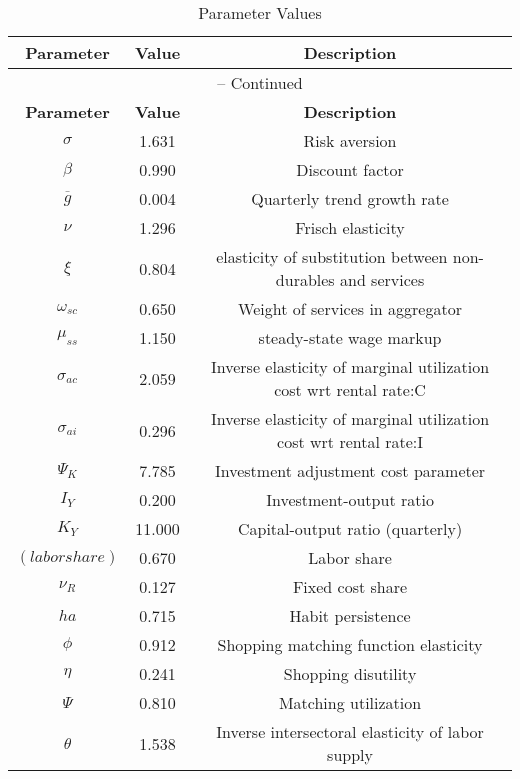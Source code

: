 \begin{center}
\begin{longtable}{ccc}
\caption{Parameter Values}\\%
\toprule%
\multicolumn{1}{c}{\textbf{Parameter}} &
\multicolumn{1}{c}{\textbf{Value}} &
 \multicolumn{1}{c}{\textbf{Description}}\\%
\midrule%
\endfirsthead
\multicolumn{3}{c}{{\tablename} \thetable{} -- Continued}\\%
\midrule%
\multicolumn{1}{c}{\textbf{Parameter}} &
\multicolumn{1}{c}{\textbf{Value}} &
  \multicolumn{1}{c}{\textbf{Description}}\\%
\midrule%
\endhead
${\sigma}$ 	 & 	 1.631 	 & 	 Risk aversion\\
${\beta}$ 	 & 	 0.990 	 & 	 Discount factor\\
${\overline{g}}$ 	 & 	 0.004 	 & 	 Quarterly trend growth rate\\
$\nu$ 	 & 	 1.296 	 & 	 Frisch elasticity\\
$\xi$ 	 & 	 0.804 	 & 	 elasticity of substitution between non-durables and services\\
$\omega_{sc}$ 	 & 	 0.650 	 & 	 Weight of services in aggregator\\
$\mu_{ss}$ 	 & 	 1.150 	 & 	 steady-state wage markup\\
${\sigma_{ac}}$ 	 & 	 2.059 	 & 	 Inverse elasticity of marginal utilization cost wrt rental rate:C\\
${\sigma_{ai}}$ 	 & 	 0.296 	 & 	 Inverse elasticity of marginal utilization cost wrt rental rate:I\\
${\Psi_{K}}$ 	 & 	 7.785 	 & 	 Investment adjustment cost parameter\\
${I_Y}$ 	 & 	 0.200 	 & 	 Investment-output ratio\\
${K_Y}$ 	 & 	 11.000 	 & 	 Capital-output ratio (quarterly)\\
$(labor share)$ 	 & 	 0.670 	 & 	 Labor share\\
${\nu_R}$ 	 & 	 0.127 	 & 	 Fixed cost share\\
${ha}$ 	 & 	 0.715 	 & 	 Habit persistence\\
${\phi}$ 	 & 	 0.912 	 & 	 Shopping matching function elasticity\\
${\eta}$ 	 & 	 0.241 	 & 	 Shopping disutility\\
${\Psi}$ 	 & 	 0.810 	 & 	 Matching utilization\\
${\theta}$ 	 & 	 1.538 	 & 	 Inverse intersectoral elasticity of labor supply\\

\end{longtable}
\end{center}
